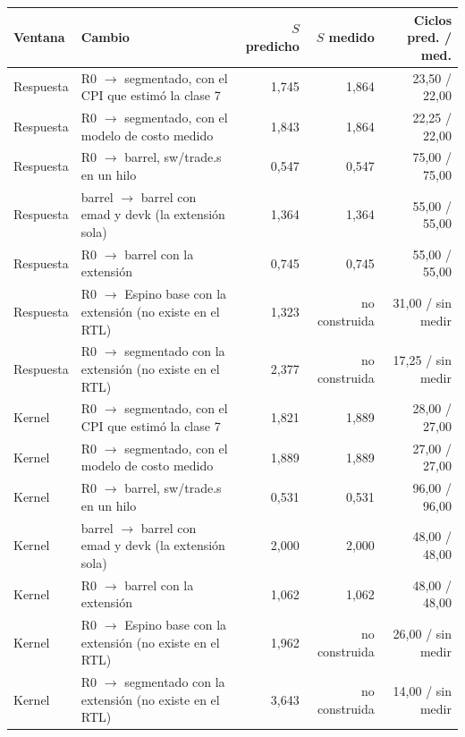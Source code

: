 \begin{tabular}{llrrr}
\toprule
Ventana & Cambio & $S$ predicho & $S$ medido & Ciclos pred. / med. \\
\midrule
Respuesta & R0 $\to$ segmentado, con el CPI que estimó la clase 7 & 1{,}745 & 1{,}864 & 23{,}50 / 22{,}00 \\
Respuesta & R0 $\to$ segmentado, con el modelo de costo medido & 1{,}843 & 1{,}864 & 22{,}25 / 22{,}00 \\
Respuesta & R0 $\to$ barrel, sw/trade.s en un hilo & 0{,}547 & 0{,}547 & 75{,}00 / 75{,}00 \\
Respuesta & barrel $\to$ barrel con emad y devk (la extensión sola) & 1{,}364 & 1{,}364 & 55{,}00 / 55{,}00 \\
Respuesta & R0 $\to$ barrel con la extensión & 0{,}745 & 0{,}745 & 55{,}00 / 55{,}00 \\
Respuesta & R0 $\to$ Espino base con la extensión (no existe en el RTL) & 1{,}323 & no construida & 31{,}00 / sin medir \\
Respuesta & R0 $\to$ segmentado con la extensión (no existe en el RTL) & 2{,}377 & no construida & 17{,}25 / sin medir \\
Kernel & R0 $\to$ segmentado, con el CPI que estimó la clase 7 & 1{,}821 & 1{,}889 & 28{,}00 / 27{,}00 \\
Kernel & R0 $\to$ segmentado, con el modelo de costo medido & 1{,}889 & 1{,}889 & 27{,}00 / 27{,}00 \\
Kernel & R0 $\to$ barrel, sw/trade.s en un hilo & 0{,}531 & 0{,}531 & 96{,}00 / 96{,}00 \\
Kernel & barrel $\to$ barrel con emad y devk (la extensión sola) & 2{,}000 & 2{,}000 & 48{,}00 / 48{,}00 \\
Kernel & R0 $\to$ barrel con la extensión & 1{,}062 & 1{,}062 & 48{,}00 / 48{,}00 \\
Kernel & R0 $\to$ Espino base con la extensión (no existe en el RTL) & 1{,}962 & no construida & 26{,}00 / sin medir \\
Kernel & R0 $\to$ segmentado con la extensión (no existe en el RTL) & 3{,}643 & no construida & 14{,}00 / sin medir \\
\bottomrule
\end{tabular}
\par{}
